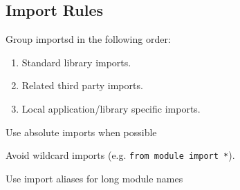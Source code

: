 \subsection{Import Rules}

Group importsd in the following order:
\begin{enumerate}
    \item Standard library imports.
    \item Related third party imports.
    \item Local application/library specific imports.
\end{enumerate}

Use absolute imports when possible

Avoid wildcard imports (e.g. \texttt{from module import *}).

Use import aliases for long module names
